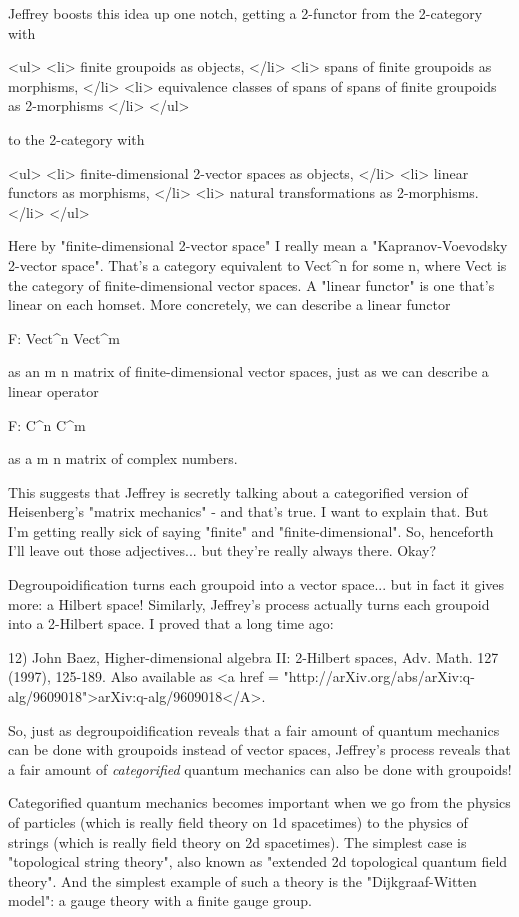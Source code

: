 Jeffrey boosts this idea up one notch, getting a 2-functor from
the 2-category with

<ul>
<li>
finite groupoids as objects,
</li>
<li>
spans of finite groupoids as morphisms,
</li>
<li>
equivalence classes of spans of spans of finite groupoids as 2-morphisms
</li>
</ul>

to the 2-category with

<ul>
<li>
finite-dimensional 2-vector spaces as objects,
</li>
<li>
linear functors as morphisms,
</li>
<li>
natural transformations as 2-morphisms.
</li>
</ul>

Here by "finite-dimensional 2-vector space" I really mean a
"Kapranov-Voevodsky 2-vector space".  That's a category
equivalent to Vect^{n} for some n, where Vect is the category
of finite-dimensional vector spaces.  A "linear functor" is
one that's linear on each homset.  More concretely, we can describe a
linear functor

F: Vect^{n} \to  Vect^{m}

as an m \times  n matrix of finite-dimensional vector spaces, just as
we can describe a linear operator

F: C^{n} \to  C^{m} 

as a m \times  n matrix of complex numbers.

This suggests that Jeffrey is secretly talking about a categorified
version of Heisenberg's "matrix mechanics" - and that's
true.  I want to explain that.  But I'm getting really sick of saying
"finite" and "finite-dimensional".  So, henceforth
I'll leave out those adjectives... but they're really always there.
Okay?

Degroupoidification turns each groupoid into a vector space... but 
in fact it gives more: a Hilbert space!  Similarly, Jeffrey's process 
actually turns each groupoid into a 2-Hilbert space.  I proved that
a long time ago:

12) John Baez, Higher-dimensional algebra II: 2-Hilbert spaces,
Adv. Math. 127 (1997), 125-189.  Also available as <a href =
"http://arXiv.org/abs/arXiv:q-alg/9609018">arXiv:q-alg/9609018</A>.

So, just as degroupoidification reveals that a fair amount of quantum
mechanics can be done with groupoids instead of vector spaces,
Jeffrey's process reveals that a fair amount of \emph{categorified}
quantum mechanics can also be done with groupoids!

Categorified quantum mechanics becomes important when we go from the
physics of particles (which is really field theory on 1d spacetimes)
to the physics of strings (which is really field theory on 2d
spacetimes).  The simplest case is "topological string
theory", also known as "extended 2d topological quantum
field theory".  And the simplest example of such a theory is the
"Dijkgraaf-Witten model": a gauge theory with a finite gauge
group.

